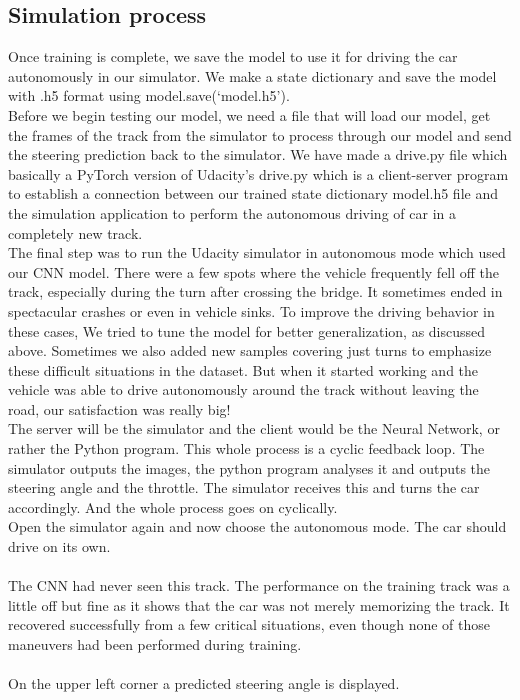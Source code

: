 \subsection{Simulation process}
Once training is complete, we save the model to use it for driving the car autonomously in our simulator. We make a state dictionary and save the model with .h5 format using model.save(‘model.h5’).\\
Before we begin testing our model, we need a file that will load our model, get the frames of the track from the simulator to process through our model and send the steering prediction back to the simulator. We have made a drive.py file which basically a PyTorch version of Udacity’s drive.py which is a client-server program to establish a connection between our trained state dictionary model.h5 file and the simulation application to perform the autonomous driving of car in a completely new track.\\
	
The final step was to run the Udacity simulator in autonomous mode which used our CNN model. There were a few spots where the vehicle frequently fell off the track, especially during the turn after crossing the bridge. It sometimes ended in spectacular crashes or even in vehicle sinks. To improve the driving behavior in these cases, We tried to tune the model for better generalization, as discussed above. Sometimes we also added new samples covering just turns to emphasize these difficult situations in the dataset. But when it started working and the vehicle was able to drive autonomously around the track without leaving the road, our satisfaction was really big!\\
	
The server will be the simulator and the client would be the Neural Network, or rather the Python program. This whole process is a cyclic feedback loop. The simulator outputs the images, the python program analyses it and outputs the steering angle and the throttle. The simulator receives this and turns the car accordingly. And the whole process goes on cyclically.\\
	
Open the simulator again and now choose the autonomous mode. The car should drive on its own.\\\\
The CNN had never seen this track. The performance on the training track was a little off but fine as it shows that the car was not merely memorizing the track. It recovered successfully from a few critical situations, even though none of those maneuvers had been performed during training.\\\\
On the upper left corner a predicted steering angle is displayed.
	
